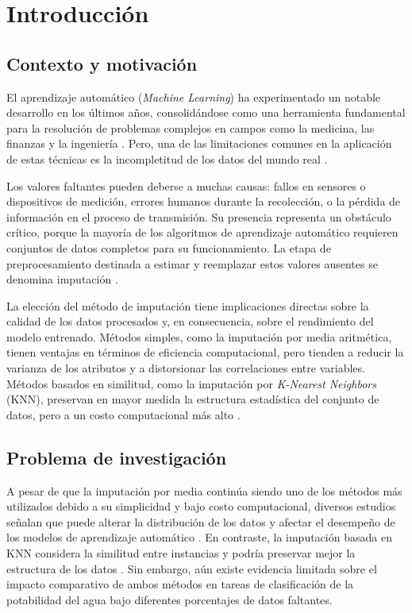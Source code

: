 \chapter{Introducción}

\section{Contexto y motivación}

El aprendizaje automático (\textit{Machine Learning}) ha experimentado un
notable desarrollo en los últimos años, consolidándose como una herramienta
fundamental para la resolución de problemas complejos en campos como la
medicina, las finanzas y la ingeniería \parencite{bishop2006}. Pero,
una de las limitaciones comunes en la aplicación de estas técnicas es la
incompletitud de los datos del mundo real \parencite{little2019}.

Los valores faltantes pueden deberse a muchas causas: fallos en
sensores o dispositivos de medición, errores humanos durante la recolección,
o la pérdida de información en el proceso de transmisión. Su presencia
representa un obstáculo crítico, porque la mayoría de los algoritmos de
aprendizaje automático requieren conjuntos de datos completos para su
funcionamiento. La etapa de preprocesamiento destinada a estimar y reemplazar
estos valores ausentes se denomina imputación \parencite{garcia2017}.

La elección del método de imputación tiene implicaciones directas sobre la
calidad de los datos procesados y, en consecuencia, sobre el rendimiento del
modelo entrenado. Métodos simples, como la imputación por media aritmética,
tienen ventajas en términos de eficiencia computacional, pero tienden a
reducir la varianza de los atributos y a distorsionar las correlaciones entre
variables. Métodos basados en similitud, como la imputación por
\textit{K-Nearest Neighbors} (KNN), preservan en mayor medida la estructura
estadística del conjunto de datos, pero a un costo computacional más
alto \parencite{troyanskaya2001}.

\section{Problema de investigación}

A pesar de que la imputación por media continúa siendo uno de los métodos más utilizados debido a su simplicidad y bajo costo computacional, diversos estudios señalan que puede alterar la distribución de los datos y afectar el desempeño de los modelos de aprendizaje automático . En contraste, la imputación basada en KNN considera la similitud entre instancias y podría preservar mejor la estructura de los datos \parencite{salgado2016}. Sin embargo, aún existe evidencia limitada sobre el impacto comparativo de ambos métodos en tareas de clasificación de la potabilidad del agua bajo diferentes porcentajes de datos faltantes. 



